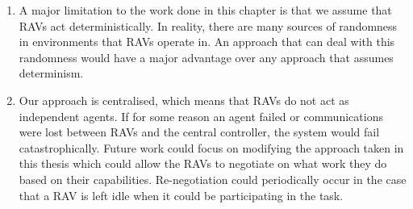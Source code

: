 \begin{enumerate}

    \item A major limitation to the work done in this chapter is that we assume that RAVs act deterministically. In reality, there are many sources of randomness in environments that RAVs operate in. An approach that can deal with this randomness would have a major advantage over any approach that assumes determinism.
    
    \item Our approach is centralised, which means that RAVs do not act as independent agents. If for some reason an agent failed or communications were lost between RAVs and the central controller, the system would fail catastrophically. Future work could focus on modifying the approach taken in this thesis which could allow the RAVs to negotiate on what work they do based on their capabilities. Re-negotiation could periodically occur in the case that a RAV is left idle when it could be participating in the task.
    

\end{enumerate}
